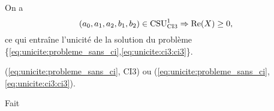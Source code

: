  \begin{prop}
    \label{prop:csu:ci3-1}
    On a 
    \begin{equation*}
      (a_0,a_1,a_2,b_1,b_2) \in \CSU[1]{CI3} \Rightarrow \Re(X)\ge 0,
    \end{equation*}
    ce qui entraîne l'unicité de la solution du problème \{\eqref{eq:unicite:probleme_sans_ci},\eqref{eq:unicite:ci3:ci3}\}.
  \end{prop}
  \begin{REM}
    (\eqref{eq:unicite:probleme_sans_ci}, CI3) ou (\eqref{eq:unicite:probleme_sans_ci},\eqref{eq:unicite:ci3:ci3}).
  \end{REM}
  \begin{REP}
    Fait
  \end{REP}
